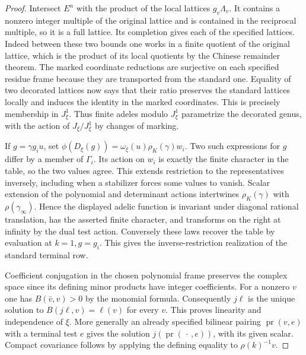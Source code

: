 \documentclass[a4paper,11pt]{article}
\theoremstyle{definition}
\theoremstyle{remark}
\numberwithin{equation}{section}
\begin{document}
\begin{proof}
Intersect \(E^n\) with the product of the local lattices
\(g_v\Lambda_v\). It contains a nonzero integer multiple
of the original lattice and is contained in the reciprocal
multiple, so it is a full lattice. Its completion gives
each of the specified lattices. Indeed
between these two bounds one works in a finite quotient
of the original lattice, which is the product of its local
quotients by the Chinese remainder theorem. The marked
coordinate reductions are surjective on each specified
residue frame because they are transported from the standard
one. Equality of two decorated lattices now says that their
ratio preserves the standard lattices locally and induces
the identity in the marked coordinates. This is precisely
membership in \(J_\xi^1\). Thus finite adeles modulo
\(J_\xi^1\) parametrize the decorated genus, with the
action of \(J_\xi/J_\xi^1\) by changes of marking.

If \(g=\gamma g_i u\), set
\(\phi(D_\xi(g))=\omega_\xi(u)\rho_K(\gamma)w_i\).
Two such expressions for \(g\) differ by a member of
\(\Gamma_i\). Its action on \(w_i\) is exactly the finite
character in the table, so the two values agree. This
extends restriction to the representatives inversely,
including when a stabilizer forces some values to vanish.
Scalar extension of the polynomial and determinant actions
intertwines \(\rho_K(\gamma)\) with
\(\rho(\gamma_\infty)\). Hence the displayed adelic
function is invariant under diagonal rational translation,
has the asserted finite character, and transforms on the
right at infinity by the dual test action. Conversely these
laws recover the table by evaluation at \(k=1,g=g_i\).
This gives the inverse-restriction realization of the
standard terminal row.

Coefficient conjugation in the chosen polynomial frame
preserves the complex space since its defining minor
products have integer coefficients. For a nonzero \(v\)
one has \(B(\bar v,v)>0\) by the monomial formula.
Consequently \(j\ell\) is the unique solution to
\(B(j\ell,v)=\ell(v)\) for every \(v\). This proves
linearity and independence of \(\xi\). More generally an
already specified bilinear pairing \(\operatorname{pr}(v,e)\)
with a terminal test \(e\) gives the solution
\(j(\operatorname{pr}(\,\cdot\,,e))\), with its given
scalar. Compact covariance follows by applying the defining
equality to \(\rho(k)^{-1}v\).


\end{proof}
\end{document}
